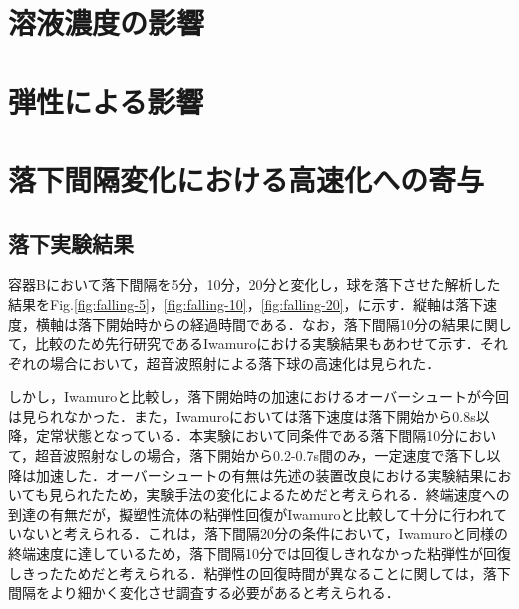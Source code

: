 \section{溶液濃度の影響}

\section{弾性による影響}

\section{落下間隔変化における高速化への寄与}
\subsection{落下実験結果}

容器Bにおいて落下間隔を5分，10分，20分と変化し，球を落下させた解析した結果をFig.\ref{fig:falling-5}，\ref{fig:falling-10}，\ref{fig:falling-20}，に示す．縦軸は落下速度，横軸は落下開始時からの経過時間である．なお，落下間隔10分の結果に関して，比較のため先行研究であるIwamuro\cite{ref:9}における実験結果もあわせて示す．それぞれの場合において，超音波照射による落下球の高速化は見られた．

しかし，Iwamuro\cite{ref:9}と比較し，落下開始時の加速におけるオーバーシュートが今回は見られなかった．また，Iwamuro\cite{ref:9}においては落下速度は落下開始から0.8s以降，定常状態となっている．本実験において同条件である落下間隔10分において，超音波照射なしの場合，落下開始から0.2-0.7s間のみ，一定速度で落下し以降は加速した．オーバーシュートの有無は先述の装置改良における実験結果においても見られたため，実験手法の変化によるためだと考えられる．終端速度への到達の有無だが，擬塑性流体の粘弾性回復がIwamuro\cite{ref:9}と比較して十分に行われていないと考えられる．これは，落下間隔20分の条件において，Iwamuro\cite{ref:9}と同様の終端速度に達しているため，落下間隔10分では回復しきれなかった粘弾性が回復しきったためだと考えられる．粘弾性の回復時間が異なることに関しては，落下間隔をより細かく変化させ調査する必要があると考えられる．

